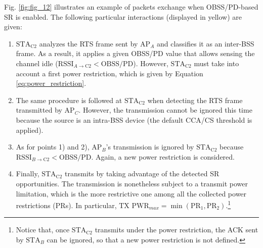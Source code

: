 \documentclass{ieeeaccess}
\begin{document}
Fig. \ref{fig:fig_12} illustrates an example of packets exchange when OBSS/PD-based SR is enabled. The following particular interactions (displayed in yellow) are given:
\begin{enumerate}
	\item $\text{STA}_\text{C2}$ analyzes the RTS frame sent by $\text{AP}_A$ and classifies it as an inter-BSS frame. As a result, it applies a given OBSS/PD value that allows sensing the channel idle ($\text{RSSI}_{A \rightarrow \text{C2}} < \text{OBSS/PD}$). However, $\text{STA}_\text{C2}$ must take into account a first power restriction, which is given by Equation \eqref{eq:power_restriction}.
	\item The same procedure is followed at $\text{STA}_\text{C2}$ when detecting the RTS frame transmitted by $\text{AP}_C$. However, the transmission cannot be ignored this time because the source is an intra-BSS device (the default CCA/CS threshold is applied).
	\item As for points 1) and 2), $\text{AP}_B$'s transmission is ignored by $\text{STA}_\text{C2}$ because $\text{RSSI}_{B \rightarrow \text{C2}} < \text{OBSS/PD}$. Again, a new power restriction is considered.
	\item Finally, $\text{STA}_\text{C2}$ transmits by taking advantage of the detected SR opportunities. The transmission is nonetheless subject to a transmit power limitation, which is the more restrictive one among all the collected power restrictions (PRs). In particular, $\text{TX PWR}_{max} = \min(\text{PR}_1, \text{PR}_2)$.\footnote{Notice that, once $\text{STA}_\text{C2}$ transmits under the power restriction, the ACK sent by $\text{STA}_B$ can be ignored, so that a new power restriction is not defined.}
\end{enumerate}
\end{document}
